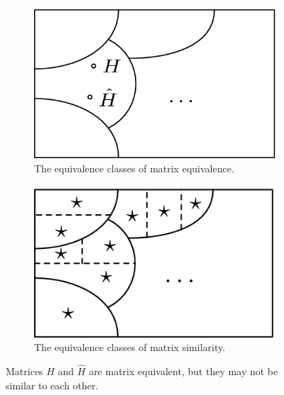 \documentclass{article}
\begin{document}
        \begin{figure}[H]
            \centering
            \begin{subfigure}{0.45\textwidth}
                \centering
                \includegraphics[scale = .35]{sp23/hw-supplements/hw5-supp/images/linalg_matrix_equivalence_classes.png}
                \caption{The equivalence classes of matrix equivalence.}
            \end{subfigure}
            \begin{subfigure}{0.45\textwidth}
                \centering
                \includegraphics[scale = .41]{sp23/hw-supplements/hw5-supp/images/linalg_matrix_similarity_equiv_classes.png}
                \caption{The equivalence classes of matrix similarity.}
            \end{subfigure}
            \caption{Matrices $H$ and $\hat{H}$ are matrix equivalent, but they may not be similar to each other.}
            \label{fig:3}
        \end{figure}
\end{document}
